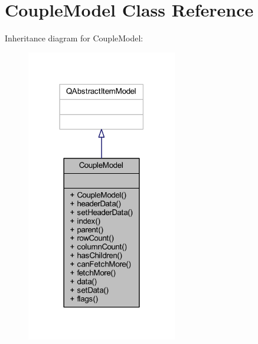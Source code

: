 \hypertarget{class_couple_model}{}\section{Couple\+Model Class Reference}
\label{class_couple_model}


Inheritance diagram for Couple\+Model\+:
\nopagebreak
\begin{figure}[H]
\begin{center}
\leavevmode
\includegraphics[width=186pt]{class_couple_model__inherit__graph}
\end{center}
\end{figure}


